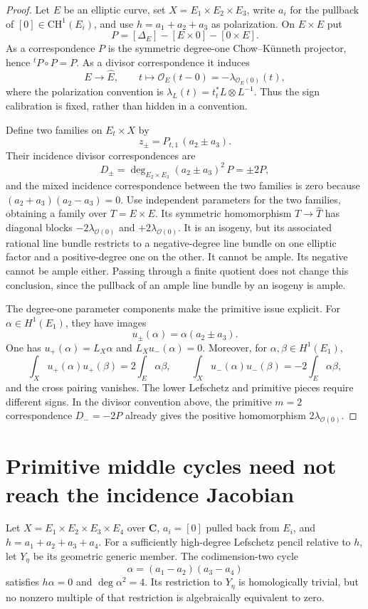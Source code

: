 \begin{proof}
Let $E$ be an elliptic curve, set $X=E_1\times E_2\times E_3$,
write $a_i$ for the pullback of $[0]\in\mathrm{CH}^1(E_i)$, and use
$h=a_1+a_2+a_3$ as polarization.  On $E\times E$ put
\[
 P=[\Delta_E]-[E\times0]-[0\times E].
\]
As a correspondence $P$ is the symmetric degree-one Chow--K\"unneth
projector, hence ${}^tP\circ P=P$.
As a divisor correspondence it induces
\[
 E\longrightarrow\widehat E,
 \qquad t\longmapsto\mathcal O_E(t-0)=-\lambda_{\mathcal O_E(0)}(t),
\]
where the polarization convention is
$\lambda_L(t)=t_t^*L\otimes L^{-1}$.
Thus the sign calibration is fixed, rather than hidden in a convention.

Define two families on $E_t\times X$ by
\[
 z_\pm=P_{t,1}\,(a_2\pm a_3).
\]
Their incidence divisor correspondences are
\[
 D_\pm=\deg_{E_2\times E_3}(a_2\pm a_3)^2\,P
       =\pm2P,
\]
and the mixed incidence correspondence between the two families
is zero because $(a_2+a_3)(a_2-a_3)=0$.
Use independent parameters for the two families, obtaining a family
over $T=E\times E$.  Its symmetric homomorphism $T\to\widehat T$
has diagonal blocks $-2\lambda_{\mathcal O(0)}$ and
$+2\lambda_{\mathcal O(0)}$.  It is an isogeny, but its associated
rational line bundle restricts to a negative-degree line bundle on one
elliptic factor and a positive-degree one on the other.  It cannot be
ample.  Its negative cannot be ample either.  Passing through a finite
quotient does not change this conclusion, since the pullback of an
ample line bundle by an isogeny is ample.

The degree-one parameter components make the primitive issue explicit.
For $\alpha\in H^1(E_1)$, they have images
\[
 u_\pm(\alpha)=\alpha(a_2\pm a_3).
\]
One has $u_+(\alpha)=L_X\alpha$ and $L_Xu_-(\alpha)=0$.
Moreover, for $\alpha,\beta\in H^1(E_1)$,
\[
 \int_Xu_+(\alpha)u_+(\beta)=2\int_E\alpha\beta,
 \qquad
 \int_Xu_-(\alpha)u_-(\beta)=-2\int_E\alpha\beta,
\]
and the cross pairing vanishes.  The lower Lefschetz and primitive
pieces require different signs.  In the divisor convention above,
the primitive $m=2$ correspondence $D_-=-2P$ already gives the
positive homomorphism $2\lambda_{\mathcal O(0)}$.
\end{proof}

\section{Primitive middle cycles need not reach the incidence Jacobian}

\begin{proposition}
\label{jac:P04}
Let $X=E_1\times E_2\times E_3\times E_4$ over $\mathbf C$,
$a_i=[0]$ pulled back from $E_i$, and $h=a_1+a_2+a_3+a_4$.
For a sufficiently high-degree Lefschetz pencil relative to $h$, let
$Y_\eta$ be its geometric generic member.  The codimension-two cycle
\[
 \alpha=(a_1-a_2)(a_3-a_4)
\]
satisfies $h\alpha=0$ and $\deg\alpha^2=4$.  Its restriction to
$Y_\eta$ is homologically trivial, but no nonzero multiple of that
restriction is algebraically equivalent to zero.
\end{proposition}

